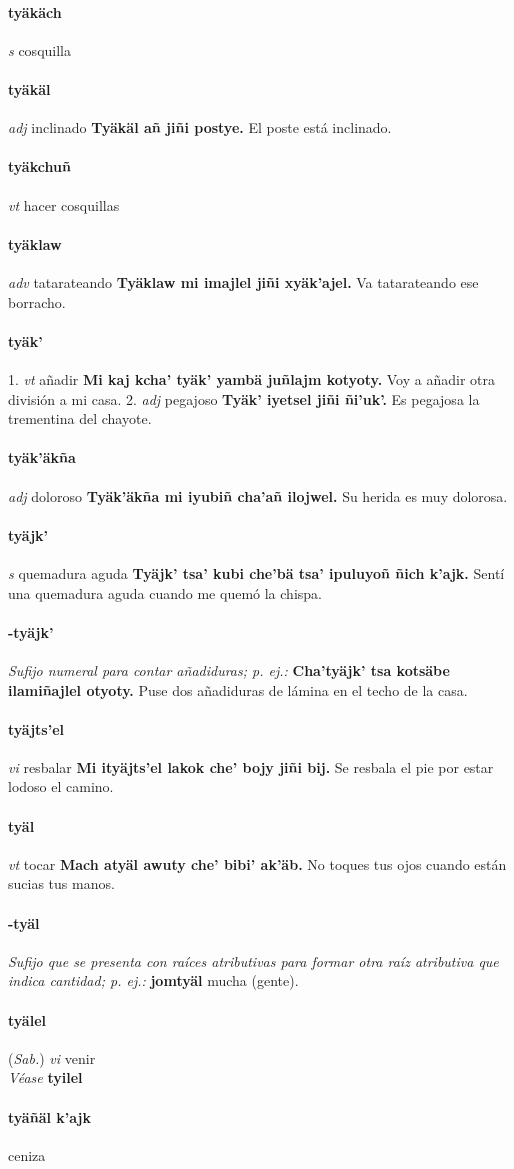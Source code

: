 \documentclass{scrbook}
\newcommand{\entry}[1]{\paragraph{#1}}
\newcommand{\onedefinition}[1]{#1.}
\newcommand{\nontranslationdef}[1]{\textit{#1}}
\newcommand{\partofspeech}[1]{\textit{#1}}
\newcommand{\spanishtranslation}[1]{#1}
\newcommand{\cholexample}[1]{\textbf{#1}}
\newcommand{\exampletranslation}[1]{#1}
\newcommand{\alsosee}[1]{\\\textit{Véase} \textbf{#1}}
\newcommand{\relevantdialect}[1]{(\textit{#1})}
\begin{document}
\begin{multicols}{2}
\entry{tyäkäch}
\partofspeech{s}
\spanishtranslation{cosquilla}

\entry{tyäkäl}
\partofspeech{adj}
\spanishtranslation{inclinado}
\cholexample{Tyäkäl añ jiñi postye.}
\exampletranslation{El poste está inclinado.}

\entry{tyäkchuñ}
\partofspeech{vt}
\spanishtranslation{hacer cosquillas}

\entry{tyäklaw}
\partofspeech{adv}
\spanishtranslation{tatarateando}
\cholexample{Tyäklaw mi imajlel jiñi xyäk'ajel.}
\exampletranslation{Va tatarateando ese borracho.}

\entry{tyäk'}
\onedefinition{1}
\partofspeech{vt}
\spanishtranslation{añadir}
\cholexample{Mi kaj kcha' tyäk' yambä juñlajm kotyoty.}
\exampletranslation{Voy a añadir otra división a mi casa.}
\onedefinition{2}
\partofspeech{adj}
\spanishtranslation{pegajoso}
\cholexample{Tyäk' iyetsel jiñi ñi'uk'.}
\exampletranslation{Es pegajosa la trementina del chayote.}

\entry{tyäk'äkña}
\partofspeech{adj}
\spanishtranslation{doloroso}
\cholexample{Tyäk'äkña mi iyubiñ cha'añ ilojwel.}
\exampletranslation{Su herida es muy dolorosa.}

\entry{tyäjk'}
\partofspeech{s}
\spanishtranslation{quemadura aguda}
\cholexample{Tyäjk' tsa' kubi che'bä tsa' ipuluyoñ ñich k'ajk.}
\exampletranslation{Sentí una quemadura aguda cuando me quemó la chispa.}

\entry{-tyäjk'}
\nontranslationdef{Sufijo numeral para contar añadiduras; p. ej.:}
\cholexample{Cha'tyäjk' tsa kotsäbe ilamiñajlel otyoty.}
\exampletranslation{Puse dos añadiduras de lámina en el techo de la casa.}

\entry{tyäjts'el}
\partofspeech{vi}
\spanishtranslation{resbalar}
\cholexample{Mi ityäjts'el lakok che' bojy jiñi bij.}
\exampletranslation{Se resbala el pie por estar lodoso el camino.}

\entry{tyäl}
\partofspeech{vt}
\spanishtranslation{tocar}
\cholexample{Mach atyäl awuty che' bibi' ak'äb.}
\exampletranslation{No toques tus ojos cuando están sucias tus manos.}

\entry{-tyäl}
\nontranslationdef{Sufijo que se presenta con raíces atributivas para formar otra raíz atributiva que indica cantidad; p. ej.:}
\cholexample{jomtyäl}
\exampletranslation{mucha (gente).}

\entry{tyälel}
\relevantdialect{Sab.}
\partofspeech{vi}
\spanishtranslation{venir}
\alsosee{tyilel}

\entry{tyäñäl k'ajk}
\spanishtranslation{ceniza}


\end{multicols}
\end{document}
